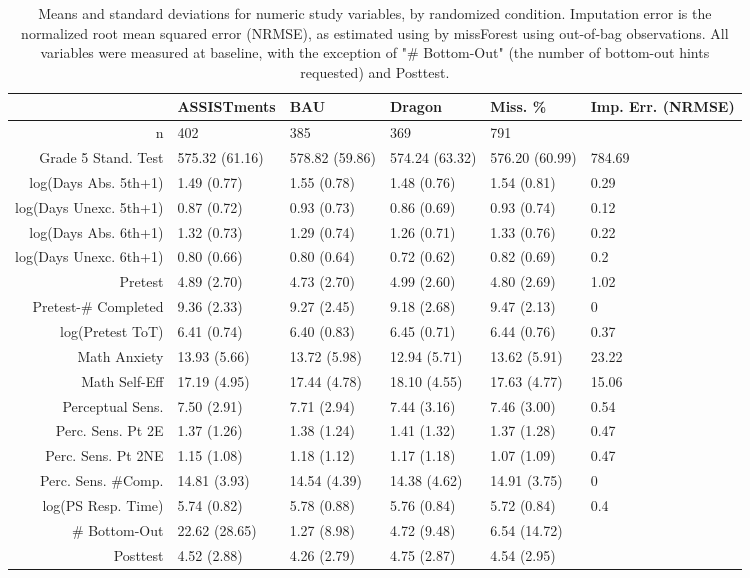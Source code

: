 \begin{sidewaystable}[ht]
\centering
\begin{tabular}{rlllll}
  \hline
 & ASSISTments & BAU & Dragon & Miss. \% & Imp. Err. (NRMSE) \\ 
  \hline
n &    402 &    385 &    369 &    791 &  \\ 
  Grade 5 Stand. Test & 575.32 (61.16) & 578.82 (59.86) & 574.24 (63.32) & 576.20 (60.99) & 784.69 \\ 
  log(Days Abs. 5th+1) &   1.49 (0.77) &   1.55 (0.78) &   1.48 (0.76) &   1.54 (0.81) & 0.29 \\ 
  log(Days Unexc. 5th+1) &   0.87 (0.72) &   0.93 (0.73) &   0.86 (0.69) &   0.93 (0.74) & 0.12 \\ 
  log(Days Abs. 6th+1) &   1.32 (0.73) &   1.29 (0.74) &   1.26 (0.71) &   1.33 (0.76) & 0.22 \\ 
  log(Days Unexc. 6th+1) &   0.80 (0.66) &   0.80 (0.64) &   0.72 (0.62) &   0.82 (0.69) & 0.2 \\ 
  Pretest &   4.89 (2.70) &   4.73 (2.70) &   4.99 (2.60) &   4.80 (2.69) & 1.02 \\ 
  Pretest-\# Completed &   9.36 (2.33) &   9.27 (2.45) &   9.18 (2.68) &   9.47 (2.13) & 0 \\ 
  log(Pretest ToT) &   6.41 (0.74) &   6.40 (0.83) &   6.45 (0.71) &   6.44 (0.76) & 0.37 \\ 
  Math Anxiety &  13.93 (5.66) &  13.72 (5.98) &  12.94 (5.71) &  13.62 (5.91) & 23.22 \\ 
  Math Self-Eff &  17.19 (4.95) &  17.44 (4.78) &  18.10 (4.55) &  17.63 (4.77) & 15.06 \\ 
  Perceptual Sens. &   7.50 (2.91) &   7.71 (2.94) &   7.44 (3.16) &   7.46 (3.00) & 0.54 \\ 
  Perc. Sens. Pt 2E &   1.37 (1.26) &   1.38 (1.24) &   1.41 (1.32) &   1.37 (1.28) & 0.47 \\ 
  Perc. Sens. Pt 2NE &   1.15 (1.08) &   1.18 (1.12) &   1.17 (1.18) &   1.07 (1.09) & 0.47 \\ 
  Perc. Sens. \#Comp. &  14.81 (3.93) &  14.54 (4.39) &  14.38 (4.62) &  14.91 (3.75) & 0 \\ 
  log(PS Resp. Time) &   5.74 (0.82) &   5.78 (0.88) &   5.76 (0.84) &   5.72 (0.84) & 0.4 \\ 
   \hline
\# Bottom-Out &  22.62 (28.65) &   1.27 (8.98) &   4.72 (9.48) &   6.54 (14.72) &  \\ 
  Posttest &   4.52 (2.88) &   4.26 (2.79) &   4.75 (2.87) &   4.54 (2.95) &  \\ 
   \hline
\end{tabular}
\caption{Means and standard deviations for numeric study variables, by randomized condition. Imputation error is the normalized root mean squared error (NRMSE), as estimated using by missForest using out-of-bag observations. All variables were measured at baseline, with the exception of "\# Bottom-Out" (the number of bottom-out hints requested) and Posttest.} 
\label{table:tab1num}
\end{sidewaystable}
